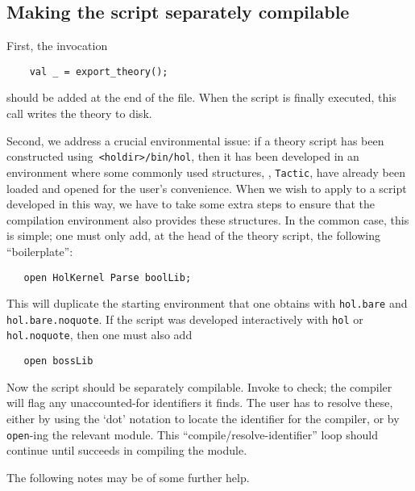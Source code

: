 \subsection{Making the script separately compilable}

First, the invocation
\begin{verbatim}
    val _ = export_theory();
\end{verbatim}
should be added at the end of the file. When the script is finally
executed, this call writes the theory to disk.

Second, we address a crucial environmental issue: if a theory script
has been constructed using\verb+ <holdir>/bin/hol+, then it has been
developed in an environment where some commonly used structures, \eg,
\verb+Tactic+, have already been loaded and opened for the user's
convenience. When we wish to apply \holmake{} to a script developed
in this way, we have to take some extra steps to ensure that the
compilation environment also provides these structures.  In the common
case, this is simple; one must only add, at the head of the theory
script, the following ``boilerplate'':
\begin{verbatim}
   open HolKernel Parse boolLib;
\end{verbatim}
This will duplicate the starting environment that one obtains with
\verb+hol.bare+ and \linebreak \verb+hol.bare.noquote+.  If the script was
developed interactively with \texttt{hol} or \texttt{hol.noquote},
then one must also add
\begin{verbatim}
   open bossLib
\end{verbatim}
Now the script should be separately compilable. Invoke \holmake{}
to check; the \ML{} compiler will flag any unaccounted-for identifiers it finds.
The user has to resolve these, either by using the `dot' notation to
locate the identifier for the compiler, or by \verb+open+-ing the
relevant module. This ``compile/resolve-identifier'' loop should
continue until \holmake{} succeeds in compiling the module.

The following notes may be of some further help.

